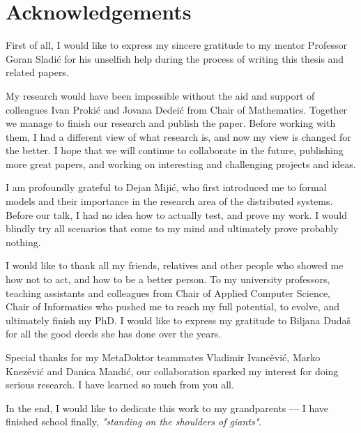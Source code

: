 \chapter*{Acknowledgements}
First of all, I would like to express my sincere gratitude to my mentor Professor Goran Sladi\'c for his unselfish help during the process of writing this thesis and related papers.

My research would have been impossible without the aid and support of colleagues Ivan Proki\'c and Jovana Dedei\'c from Chair of Mathematics. Together we manage to finish our research and publish the paper. Before working with them, I had a different view of what research is, and now my view is changed for the better. I hope that we will continue to collaborate in the future, publishing more great papers, and working on interesting and challenging projects and ideas.

I am profoundly grateful to Dejan Miji\'c, who first introduced me to formal models and their importance in the research area of the distributed systems. Before our talk, I had no idea how to actually test, and prove my work. I would blindly try all scenarios that come to my mind and ultimately prove probably nothing.

I would like to thank all my friends, relatives and other people who showed me how not to act, and how to be a better person. To my university professors, teaching assistants and colleagues from Chair of Applied Computer Science, Chair of Informatics who pushed me to reach my full potential, to evolve, and ultimately finish my PhD. I would like to express my gratitude to Biljana Duda\v s for all the good deeds she has done over the years.

Special thanks for my MetaDoktor teammates Vladimir Ivanc\v evi\'c, Marko Knez\v evi\'c and Danica Mandi\'c, our collaboration sparked my interest for doing serious research. I have learned so much from you all.

In the end, I would like to dedicate this work to my grandparents --- I have finished school finally, \emph{"standing on the shoulders of giants"}.